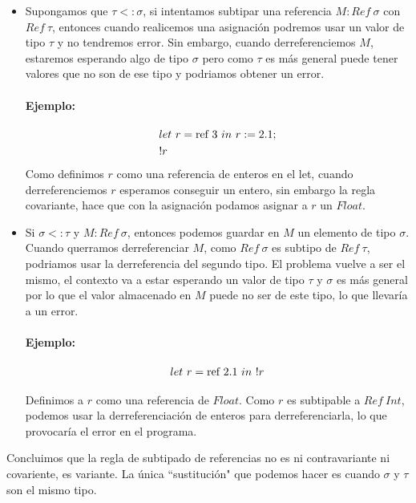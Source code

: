 \begin{itemize}
	\item Supongamos que $\tau <: \sigma$, si intentamos subtipar una referencia $M:Ref~\sigma$ con $Ref~\tau$, entonces cuando realicemos una asignación podremos usar un valor de tipo $\tau$ y no tendremos error. Sin embargo, cuando derreferenciemos $M$, estaremos esperando algo de tipo $\sigma$ pero como $\tau$ es más general puede tener valores que no son de ese tipo y podriamos obtener un error.
	
	\paragraph{Ejemplo:}\begin{align*}
	&let~r = \text{ref}~3~in~r := 2.1; \\
	&!r
	\end{align*}
	Como definimos $r$ como una referencia de enteros en el let, cuando derreferenciemos $r$ esperamos conseguir un entero, sin embargo la regla covariante, hace que con la asignación podamos asignar a $r$ un $Float$.
	
	\item Si  $\sigma <: \tau$ y $M: Ref~\sigma$, entonces podemos guardar en $M$ un elemento de tipo $\sigma$. Cuando querramos derreferenciar $M$, como $Ref~\sigma$ es subtipo de $Ref~\tau$, podriamos usar la derreferencia del segundo tipo. El problema vuelve a ser el mismo, el contexto va a estar esperando un valor de tipo $\tau$ y $\sigma$ es más general por lo que el valor almacenado en $M$ puede no ser de este tipo, lo que llevaría a un error.
	
	\paragraph{Ejemplo:}\begin{align}
	let~r = \text{ref}~2.1~in~!r
	\end{align}
	
	Definimos a $r$ como una referencia de $Float$. Como $r$ es subtipable a $Ref~Int$, podemos usar la derreferenciación de enteros para derreferenciarla, lo que provocaría el error en el programa.
	
\end{itemize}

Concluimos que la regla de subtipado de referencias no es ni contravariante ni covariente, es variante. La única ``sustitución" que podemos hacer es cuando $\sigma$ y $\tau$ son el mismo tipo.

